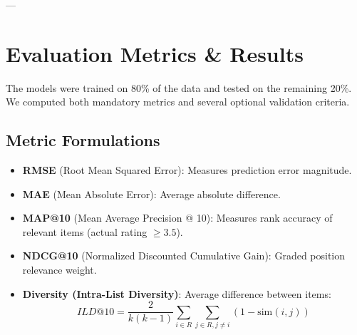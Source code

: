 \documentclass[11pt,a4paper]{article}
\begin{document}
---

\section{Evaluation Metrics \& Results}
The models were trained on 80\% of the data and tested on the remaining 20\%. We computed both mandatory metrics and several optional validation criteria.

\subsection{Metric Formulations}
\begin{itemize}
    \item \textbf{RMSE} (Root Mean Squared Error): Measures prediction error magnitude.
    \item \textbf{MAE} (Mean Absolute Error): Average absolute difference.
    \item \textbf{MAP@10} (Mean Average Precision @ 10): Measures rank accuracy of relevant items (actual rating $\ge 3.5$).
    \item \textbf{NDCG@10} (Normalized Discounted Cumulative Gain): Graded position relevance weight.
    \item \textbf{Diversity (Intra-List Diversity)}: Average difference between items:
    \begin{equation}
    ILD@10 = \frac{2}{k(k-1)}\sum_{i \in R} \sum_{j \in R, j \neq i} (1 - \text{sim}(i, j))
    \end{equation}
\end{itemize}
\end{document}
